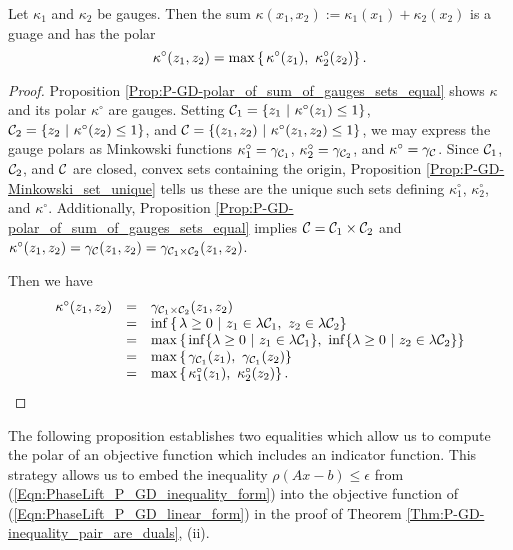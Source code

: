 \begin{prop}			\label{Prop:P-GD-polar_of_sum_of_gauges}
Let $\kappa_1$ and $\kappa_2$ be gauges.  Then the sum $\kappa(x_1, x_2) := \kappa_1(x_1) + \kappa_2(x_2)$ is a guage and has the polar
\begin{equation}			\label{Eqn:polar_of_sum_of_gauges}
\kappa^\circ(z_1, z_2) = \max \left\{ \halfspace \kappa^\circ(z_1), \ \kappa_2^\circ(z_2) \right\}.
\end{equation}
\end{prop}
\begin{proof}
Proposition \ref{Prop:P-GD-polar_of_sum_of_gauges_sets_equal} shows $\kappa$ and its polar $\kappa^\circ$ are gauges.  Setting $\caC_1 = \{ z_1 \ | \ \kappa^\circ(z_1) \leq 1 \}$, ${\mathcal C}_2 = \{ z_2 \ | \ \kappa^\circ(z_2) \leq 1 \}$, and ${\mathcal C} = \{ (z_1, z_2) \ | \ \kappa^\circ(z_1, z_2) \leq 1 \}$, we may express the gauge polars as Minkowski functions $\kappa_1^\circ = \gamma_{{\mathcal C}_1}$, $\kappa_2^\circ = \gamma_{{\mathcal C}_2}$, and $\kappa^\circ = \gamma_{{\mathcal C}}$.  Since ${\mathcal C}_1$, ${\mathcal C}_2$, and ${\mathcal C}$ are closed, convex sets containing the origin, Proposition \ref{Prop:P-GD-Minkowski_set_unique} tells us these are the unique such sets defining $\kappa_1^\circ$, $\kappa_2^\circ$, and $\kappa^\circ$.  Additionally, Proposition \ref{Prop:P-GD-polar_of_sum_of_gauges_sets_equal} implies ${\mathcal C} = {\mathcal C}_1 \times {\mathcal C}_2$ and $\kappa^\circ(z_1, z_2) =	\gamma_{{\mathcal C}}(z_1, z_2) 	=	\gamma_{{\mathcal C}_1 \times {\mathcal C}_2}(z_1, z_2)$.


Then we have
\begin{equation}
\begin{array}{rll}
\kappa^\circ(z_1, z_2)	  & =	&	\gamma_{\caC_1 \times \caC_2}(z_1, z_2)	\\
	&	=	&	\inf \left\{ \halfspace \lambda \geq 0 \ | \ z_1 \in \lambda \caC_1, \ z_2 \in \lambda \caC_2 \right\} \\
	&	=	&	\max \left\{ \halfspace \inf \{ \lambda \geq 0 \ | \ z_1 \in \lambda \caC_1 \}, 
									\ \inf \{ \lambda \geq 0 \ | \ z_2 \in \lambda \caC_2 \} 	\right\}	\\
	&	=	&	\max \left\{ \halfspace \gamma_{\caC_1}(z_1), \ \gamma_{\caC_1}(z_2) \right\}	\\
	&	=	&	\max \left\{ \halfspace \kappa_1^\circ(z_1), \ \kappa_2^\circ(z_2) \right\}.
\end{array}
\end{equation}
\end{proof}


The following proposition establishes two equalities which allow us to compute the polar of an objective function which includes an indicator function.  This strategy allows us to embed the inequality $\rho(Ax-b) \leq \epsilon$ from (\ref{Eqn:PhaseLift_P_GD_inequality_form}) into the objective function of (\ref{Eqn:PhaseLift_P_GD_linear_form}) in the proof of Theorem \ref{Thm:P-GD-inequality_pair_are_duals}, (ii).



